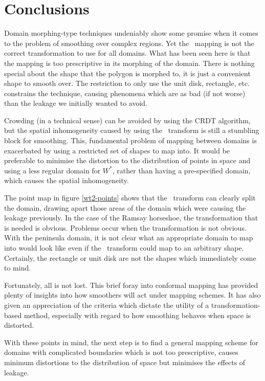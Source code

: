 \section{Conclusions}
\label{sc-conclusions}

Domain morphing-type techniques undeniably show some promise when it comes to the problem of smoothing over complex regions. Yet the \sch\ mapping is not the correct transformation to use for  all domains. What has been seen here is that the mapping is too prescriptive in its morphing of the domain. There is nothing special about the shape that the polygon is morphed to, it is just a convenient shape to smooth over. The restriction to only use the unit disk, rectangle, etc. constrains the technique, causing phenomena which are as bad (if not worse) than the leakage we initially wanted to avoid.

Crowding (in a technical sense) can be avoided by using the CRDT algorithm, but the spatial inhomogeneity caused by using the \sch\ transform is still a stumbling block for smoothing. This, fundamental problem of mapping between domains is exacerbated by using a restricted set of shapes to map into. It would be preferable to minimise the distortion to the distribution of points in space and using a less regular domain for $W^*$, rather than having a pre-specified domain, which causes the spatial inhomogeneity.

The point map in figure \ref{wt2-points} shows that the \sch\ transform can clearly split the domain, drawing apart those areas of the domain which were causing the leakage previously. In the case of the Ramsay horseshoe, the transformation that is needed is obvious. Problems occur when the transformation is not obvious. With the peninsula domain, it is not clear what an appropriate domain to map into would look like even if the \sch\ transform could map to an arbitrary shape. Certainly, the rectangle or unit disk are not the shapes which immediately come to mind.

Fortunately, all is not lost. This brief foray into conformal mapping has provided plenty of insights into how smoothers will act under mapping schemes. It has also given an appreciation of the criteria which dictate the utility of a transformation-based method, especially with regard to how smoothing behaves when space is distorted.

With these points in mind, the next step is to find a general mapping scheme for domains with complicated boundaries which is not too prescriptive, causes minimum distortions to the distribution of space but minimises the effects of leakage.



